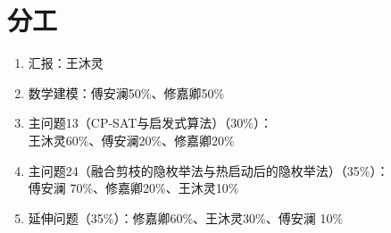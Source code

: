 \section{分工}
\begin{enumerate}
	\item 汇报：王沐灵
	\item 数学建模：傅安澜50\%、修嘉卿50\%
	\item 主问题13（CP-SAT与启发式算法）（30\%）：\\
	王沐灵60\%、傅安澜20\%、修嘉卿20\%
	\item 主问题24（融合剪枝的隐枚举法与热启动后的隐枚举法）（35\%）：\\
	傅安澜 70\%、修嘉卿20\%、王沐灵10\%
	\item 延伸问题（35\%）：修嘉卿60\%、王沐灵30\%、傅安澜 10\%
\end{enumerate}